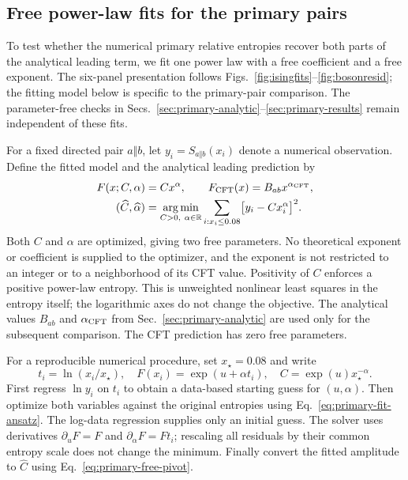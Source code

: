\subsection{Free power-law fits for the primary pairs}
\label{sec:primary-fits}
To test whether the numerical primary relative entropies recover both
parts of the analytical leading term, we fit one power law with a
free coefficient and a free exponent. The six-panel presentation follows
Figs.~\ref{fig:isingfits}--\ref{fig:bosonresid}; the fitting model below
is specific to the primary-pair comparison. The parameter-free checks
in Secs.~\ref{sec:primary-analytic}--\ref{sec:primary-results} remain
independent of these fits.

For a fixed directed pair $a\Vert b$, let $y_i=S_{a\Vert b}(x_i)$
denote a numerical observation. Define the fitted model and the
analytical leading prediction by
\begin{align}
 F(x;C,\alpha)&=Cx^\alpha,\qquad
 F_{\rm CFT}(x)=B_{ab}x^{\alpha_{\rm CFT}}, \notag\\
 (\widehat C,\widehat\alpha)
 &=\mathop{\mathrm{arg\,min}}_{C>0,\ \alpha\in\mathbb R}
   \sum_{i:x_i\leq0.08}\bigl[y_i-Cx_i^\alpha\bigr]^2 .
 \label{eq:primary-fit-ansatz}
\end{align}
Both $C$ and $\alpha$ are optimized, giving two free parameters.
No theoretical exponent or coefficient is supplied to the optimizer,
and the exponent is not restricted to an integer or to a neighborhood
of its CFT value. Positivity of $C$ enforces a positive power-law
entropy. This is unweighted nonlinear least squares in the entropy
itself; the logarithmic axes do not change the objective.
The analytical values $B_{ab}$ and $\alpha_{\rm CFT}$ from
Sec.~\ref{sec:primary-analytic} are used only for the subsequent
comparison. The CFT prediction has zero free parameters.

For a reproducible numerical procedure, set $x_\star=0.08$ and write
\begin{equation}
 t_i=\ln(x_i/x_\star),\quad
 F(x_i)=\exp(u+\alpha t_i),\quad
 C=\exp(u)x_\star^{-\alpha}.
 \label{eq:primary-free-pivot}
\end{equation}
First regress $\ln y_i$ on $t_i$ to obtain a data-based starting
guess for $(u,\alpha)$. Then optimize both variables against the
original entropies using Eq.~\eqref{eq:primary-fit-ansatz}.
The log-data regression supplies only an initial guess.
The solver uses derivatives
$\partial_uF=F$ and $\partial_\alpha F=Ft_i$;
rescaling all residuals by their common entropy scale does not
change the minimum. Finally convert the fitted amplitude to
$\widehat C$ using Eq.~\eqref{eq:primary-free-pivot}.

